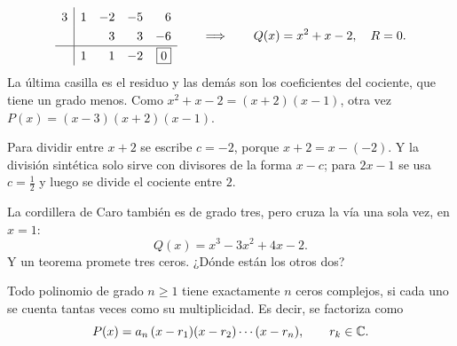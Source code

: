 \documentclass[11pt,a4paper]{article}
\begin{document}
\begin{ejemplo}[$P(x)=x^3-2x^2-5x+6$ entre $x-3$]
\[
\renewcommand{\arraystretch}{1.3}
\begin{array}{c|rrrr}
3 & 1 & -2 & -5 & 6\\
  &   & 3 & 3 & -6\\ \hline
  & 1 & 1 & -2 & \fbox{$0$}
\end{array}
\qquad\Longrightarrow\qquad
Q(x)=x^2+x-2,\quad R=0 .
\]
La última casilla es el residuo y las demás son los coeficientes del cociente, que tiene un grado menos. Como
$x^2+x-2=(x+2)(x-1)$, otra vez $P(x)=(x-3)(x+2)(x-1)$.
\end{ejemplo}

\begin{ojo}[El signo de $c$]
Para dividir entre $x+2$ se escribe $c=-2$, porque $x+2=x-(-2)$. Y la división sintética solo sirve con divisores
de la forma $x-c$; para $2x-1$ se usa $c=\tfrac12$ y luego se divide el cociente entre $2$.
\end{ojo}


La cordillera de Caro también es de grado tres, pero cruza la vía una sola vez, en $x=1$:
\[ Q(x)=x^3-3x^2+4x-2 . \]
Y un teorema promete tres ceros. ¿Dónde están los otros dos?

\begin{propiedad}
Todo polinomio de grado $n\ge 1$ tiene exactamente $n$ ceros complejos, si cada uno se cuenta tantas veces como
su multiplicidad. Es decir, se factoriza como
\[ P(x)=a_n\,(x-r_1)(x-r_2)\cdots(x-r_n),\qquad r_k\in\mathbb{C} . \]
\end{propiedad}
\end{document}
